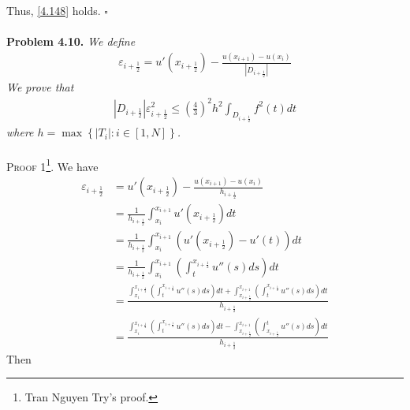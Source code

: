 \documentclass[a4paper]{article}
\numberwithin{equation}{section}
\begin{document}
Thus, \eqref{4.148} holds. \hfill $\square$\\
\\
\textbf{Problem 4.10.} \textit{We define}
\begin{align}
{\varepsilon _{i + \frac{1}{2}}} = u'\left( {{x_{i + \frac{1}{2}}}} \right) - \frac{{u\left( {{x_{i + 1}}} \right) - u\left( {{x_i}} \right)}}{{\left| {{D_{i + \frac{1}{2}}}} \right|}}
\end{align}
\textit{We prove that}
\begin{align}
\label{4.162}
\left| {{D_{i + \frac{1}{2}}}} \right|\varepsilon _{i + \frac{1}{2}}^2 \le {\left( {\frac{4}{3}} \right)^2}{h^2}\int_{{D_{i + \frac{1}{2}}}} {{f^2}\left( t \right)dt} 
\end{align}
\textit{where $h = \max \left\{ {\left| {{T_i}} \right|:i \in \left[ {1,N} \right]} \right\}$.}\\
\\
\textsc{Proof 1\footnote{Tran Nguyen Try's proof.}.} We have
\begin{align}
{\varepsilon _{i + \frac{1}{2}}} &= u'\left( {{x_{i + \frac{1}{2}}}} \right) - \frac{{u\left( {{x_{i + 1}}} \right) - u\left( {{x_i}} \right)}}{{{h_{i + \frac{1}{2}}}}}\\
& = \frac{1}{{{h_{i + \frac{1}{2}}}}}\int_{{x_i}}^{{x_{i + 1}}} {u'\left( {{x_{i + \frac{1}{2}}}} \right)dt} \\
& = \frac{1}{{{h_{i + \frac{1}{2}}}}}\int_{{x_i}}^{{x_{i + 1}}} {\left( {u'\left( {{x_{i + \frac{1}{2}}}} \right) - u'\left( t \right)} \right)dt} \\
& = \frac{1}{{{h_{i + \frac{1}{2}}}}}\int_{{x_i}}^{{x_{i + 1}}} {\left( {\int_t^{{x_{i + \frac{1}{2}}}} {u''\left( s \right)ds} } \right)dt} \\
& = \frac{{\int_{{x_i}}^{{x_{i + \frac{1}{2}}}} {\left( {\int_t^{{x_{i + \frac{1}{2}}}} {u''\left( s \right)ds} } \right)dt}  + \int_{{x_{i + \frac{1}{2}}}}^{{x_{i + 1}}} {\left( {\int_t^{{x_{i + \frac{1}{2}}}} {u''\left( s \right)ds} } \right)dt} }}{{{h_{i + \frac{1}{2}}}}}\\
& = \frac{{\int_{{x_i}}^{{x_{i + \frac{1}{2}}}} {\left( {\int_t^{{x_{i + \frac{1}{2}}}} {u''\left( s \right)ds} } \right)dt}  - \int_{{x_{i + \frac{1}{2}}}}^{{x_{i + 1}}} {\left( {\int_{{x_{i + \frac{1}{2}}}}^t {u''\left( s \right)ds} } \right)dt} }}{{{h_{i + \frac{1}{2}}}}}
\end{align}
Then
\end{document}
